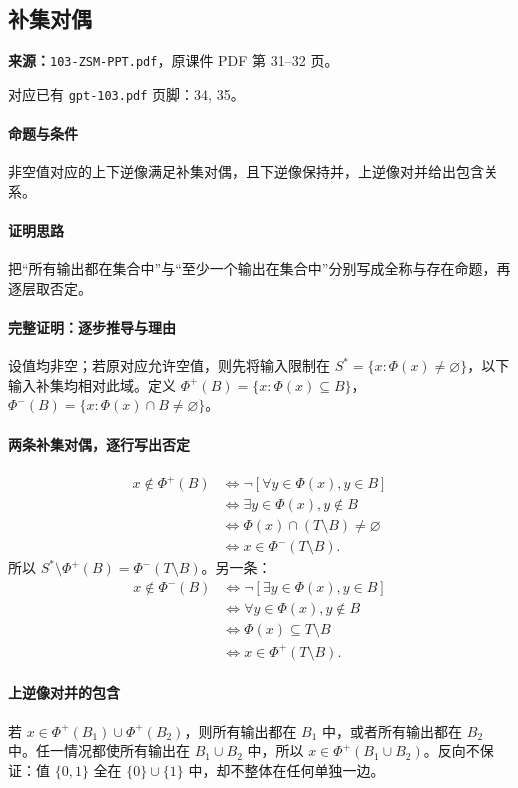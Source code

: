 \clearpage\subsection{补集对偶}
\textbf{来源：}\texttt{103-ZSM-PPT.pdf}，原课件 PDF 第 31--32 页。\par
对应已有 \texttt{gpt-103.pdf} 页脚：34, 35。\par
\paragraph{命题与条件}非空值对应的上下逆像满足补集对偶，且下逆像保持并，上逆像对并给出包含关系。
\paragraph{证明思路}把“所有输出都在集合中”与“至少一个输出在集合中”分别写成全称与存在命题，再逐层取否定。
\paragraph{完整证明：逐步推导与理由}

设值均非空；若原对应允许空值，则先将输入限制在 $S^*=\{x:\Phi(x)\ne\varnothing\}$，以下输入补集均相对此域。定义 $\Phi^+(B)=\{x:\Phi(x)\subseteq B\}$，$\Phi^-(B)=\{x:\Phi(x)\cap B\ne\varnothing\}$。
\paragraph{两条补集对偶，逐行写出否定}
\begin{align*}
x\notin\Phi^+(B)&\iff\neg[\forall y\in\Phi(x),y\in B]\\
&\iff\exists y\in\Phi(x),y\notin B\\
&\iff\Phi(x)\cap(T\setminus B)\ne\varnothing\\
&\iff x\in\Phi^-(T\setminus B).
\end{align*}
所以 $S^*\setminus\Phi^+(B)=\Phi^-(T\setminus B)$。另一条：
\begin{align*}
x\notin\Phi^-(B)&\iff\neg[\exists y\in\Phi(x),y\in B]\\
&\iff\forall y\in\Phi(x),y\notin B\\
&\iff\Phi(x)\subseteq T\setminus B\\
&\iff x\in\Phi^+(T\setminus B).
\end{align*}
\paragraph{上逆像对并的包含}
若 $x\in\Phi^+(B_1)\cup\Phi^+(B_2)$，则所有输出都在 $B_1$ 中，或者所有输出都在 $B_2$ 中。任一情况都使所有输出在 $B_1\cup B_2$ 中，所以 $x\in\Phi^+(B_1\cup B_2)$。反向不保证：值 $\{0,1\}$ 全在 $\{0\}\cup\{1\}$ 中，却不整体在任何单独一边。
